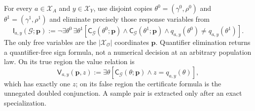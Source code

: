 For every \(a\in\mathcal X_A\) and \(y\in\mathcal X_Y\), use disjoint copies \(\theta^0=(\gamma^0,\rho^0)\) and \(\theta^1=(\gamma^1,\rho^1)\) and eliminate precisely those response variables from \[\mathsf I_{a,y}(\mathcal G;\mathbf p):=\neg\exists\theta^0\,\exists\theta^1\left[\mathsf C_{\mathcal G}(\theta^0;\mathbf p)\wedge\mathsf C_{\mathcal G}(\theta^1;\mathbf p)\wedge q_{a,y}(\theta^0)\neq q_{a,y}(\theta^1)\right].\] The only free variables are the \(|\mathcal X_{\mathcal O}|\) coordinates \(\mathbf p\). Quantifier elimination returns a quantifier-free sign formula, not a numerical decision at an arbitrary population law. On its true region the value relation is \[\mathsf V_{a,y}(\mathbf p,z):=\exists\theta\left[\mathsf C_{\mathcal G}(\theta;\mathbf p)\wedge z=q_{a,y}(\theta)\right],\] which has exactly one \(z\); on its false region the certificate formula is the unnegated doubled conjunction. A sample pair is extracted only after an exact specialization.